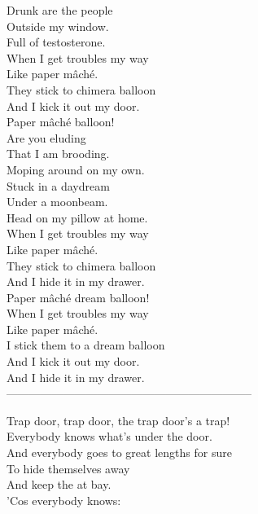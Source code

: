 Drunk are the people \\
Outside my window. \\
Full of testosterone. \\

When I get troubles my way \\
Like paper mâché. \\
They stick to chimera balloon \\
And I kick it out my door. \\

Paper mâché  balloon! \\

Are you eluding \\
That I am brooding. \\
Moping around on my own. \\

Stuck in a daydream \\
Under a moonbeam. \\
Head on my pillow at home. \\

When I get troubles my way \\
Like paper mâché. \\
They stick to chimera balloon \\
And I hide it in my drawer. \\

Paper mâché dream balloon! \\

When I get troubles my way \\
Like paper mâché. \\
I stick them to a dream balloon \\
And I kick it out my door. \\

And I hide it in my drawer. \\

-----------------------------------------------------------------



Trap door, trap door, the trap door's a trap! \\

Everybody knows what's under the door. \\
And everybody goes to great lengths for sure \\
To hide themselves away \\
And keep the  at bay. \\
'Cos everybody knows: \\

